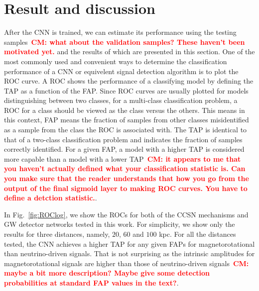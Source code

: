 \documentclass[aps,twocolumn,showpacs,groupedaddress, nofootinbib]{revtex4}  %
\newcommand{\cm}[1]{\textbf{\textcolor{red}{CM: #1}}}
\begin{document}
\section{Result and discussion}\label{sec:result}
%
%
After the \ac{CNN} is trained, we can estimate its performance using the
testing samples~\cm{what about the validation samples? These haven't been
motivated yet.} and the results of which are presented in this section. One of
the most commonly used and convenient ways to determine the classification
performance of a \ac{CNN} or equivelent signal detection algorithm is to plot
the \ac{ROC} curve. A \ac{ROC} shows the performance of a classifying model by
defining the \ac{TAP} as a function of the \ac{FAP}. Since \ac{ROC} curves are
usually plotted for models distinguishing between two classes, for a
multi-class classification problem, a \ac{ROC} for a class should be viewed as
the class versus the others. This means in this context, \ac{FAP} means the
fraction of samples from other classes misidentified as a sample from the class
the \ac{ROC} is associated with. The \ac{TAP} is identical to that of a
two-class classification problem and indicates the fraction of samples
correctly identified.  For a given \ac{FAP}, a model with a higher \ac{TAP} is
considered more capable than a model with a lower \ac{TAP}~\cm{it appears to me
that you haven't actually defined what your classification statistic is. Can
you make sure that the reader understands that how you go from the output of
the final sigmoid layer to making ROC curves. You have to define a detction
statistic.}. 

%
%
In Fig.~\ref{fig:ROClog}, we show the \acp{ROC} for both of the \ac{CCSN}
mechanisms and \ac{GW} detector networks tested in this work. For simplicity,
we show only the results for three distances, namely, $20$, $60$ and $100$ kpc.
For all the distances tested, the \ac{CNN} achieves a higher \ac{TAP} for any
given \acp{FAP} for magnetorotational than neutrino-driven signals.  That is
not surprising as the intrinsic amplitudes for magnetorotational signals are
higher than those of neutrino-driven signals~\cm{maybe a bit more description?
Maybe give some detection probabilities at standard FAP values in the text?}.
\end{document}
